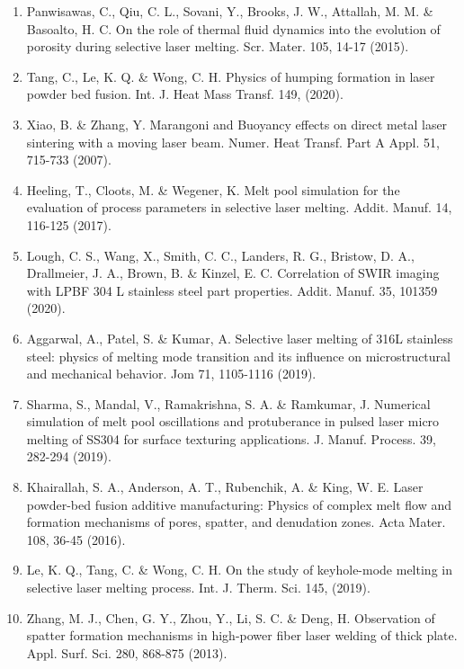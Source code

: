 \documentclass[10pt]{article}
\begin{document}
\begin{enumerate}
  \item Panwisawas, C., Qiu, C. L., Sovani, Y., Brooks, J. W., Attallah, M. M. \& Basoalto, H. C. On the role of thermal fluid dynamics into the evolution of porosity during selective laser melting. Scr. Mater. 105, 14-17 (2015).

  \item Tang, C., Le, K. Q. \& Wong, C. H. Physics of humping formation in laser powder bed fusion. Int. J. Heat Mass Transf. 149, (2020).

  \item Xiao, B. \& Zhang, Y. Marangoni and Buoyancy effects on direct metal laser sintering with a moving laser beam. Numer. Heat Transf. Part A Appl. 51, 715-733 (2007).

  \item Heeling, T., Cloots, M. \& Wegener, K. Melt pool simulation for the evaluation of process parameters in selective laser melting. Addit. Manuf. 14, 116-125 (2017).

  \item Lough, C. S., Wang, X., Smith, C. C., Landers, R. G., Bristow, D. A., Drallmeier, J. A., Brown, B. \& Kinzel, E. C. Correlation of SWIR imaging with LPBF 304 L stainless steel part properties. Addit. Manuf. 35, 101359 (2020).

  \item Aggarwal, A., Patel, S. \& Kumar, A. Selective laser melting of 316L stainless steel: physics of melting mode transition and its influence on microstructural and mechanical behavior. Jom 71, 1105-1116 (2019).

  \item Sharma, S., Mandal, V., Ramakrishna, S. A. \& Ramkumar, J. Numerical simulation of melt pool oscillations and protuberance in pulsed laser micro melting of SS304 for surface texturing applications. J. Manuf. Process. 39, 282-294 (2019).

  \item Khairallah, S. A., Anderson, A. T., Rubenchik, A. \& King, W. E. Laser powder-bed fusion additive manufacturing: Physics of complex melt flow and formation mechanisms of pores, spatter, and denudation zones. Acta Mater. 108, 36-45 (2016).

  \item Le, K. Q., Tang, C. \& Wong, C. H. On the study of keyhole-mode melting in selective laser melting process. Int. J. Therm. Sci. 145, (2019).

  \item Zhang, M. J., Chen, G. Y., Zhou, Y., Li, S. C. \& Deng, H. Observation of spatter formation mechanisms in high-power fiber laser welding of thick plate. Appl. Surf. Sci. 280, 868-875 (2013).


\end{enumerate}
\end{document}
